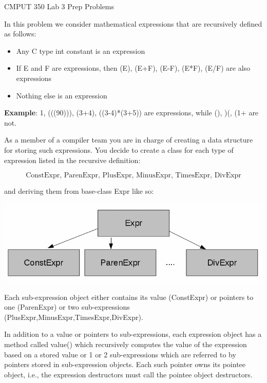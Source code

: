 \documentclass[a4paper,11pt]{article}
\begin{document}

\begin{center}
{\Large CMPUT 350 Lab 3 Prep Problems}
\end{center}


\linerule

In this problem we consider mathematical expressions that are recursively defined as follows:
\begin{itemize}
    \item Any C type int constant is an expression
    \item If E and F are expressions, then (E), (E+F), (E-F), (E*F), (E/F) are also expressions
    \item Nothing else is an expression
\end{itemize}

\textbf{Example}: 1, (((90))), (3+4), ((3-4)*(3+5)) are expressions, while (), )(, (1+ are not.

\medskip

As a member of a compiler team you are in charge of creating a data structure for storing such expressions. 
You decide to create a class for each type of expression listed in the recursive definition:

\[ \text{ConstExpr, ParenExpr, PlusExpr, MinusExpr, TimesExpr, DivExpr} \]

and deriving them from base-class Expr like so:

\includegraphics[width=0.8\linewidth]{tree.png}

Each sub-expression object either contains its value (ConstExpr) or pointers to one (ParenExpr) or two sub-expressions 
(PlusExpr,MinusExpr,TimesExpr,DivExpr).

\medskip

In addition to a value or pointers to sub-expressions, 
each expression object has a method called value() which recursively computes the value of the 
expression based on a stored value or 1 or 2 sub-expressions which are referred to by pointers 
stored in sub-expression objects. 
Each such pointer owns its pointee object, i.e., the expression destructors must call the pointee object destructors.
\end{document}
